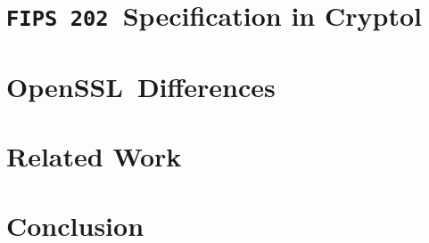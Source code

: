 \documentclass[runningheads]{llncs}
\newcommand{\fips}{\texttt{FIPS 202}}
\newcommand{\cryptol}{Cryptol}
\newcommand{\openssl}{OpenSSL}
\begin{document}
\section{\fips\ Specification in \cryptol}\label{sec:fips}


\section{\openssl\ Differences}\label{sec:openssl}


\section{Related Work}\label{sec:related}


\section{Conclusion}\label{sec:conclusion}


%
%
%
%
%
%


%
\end{document}
